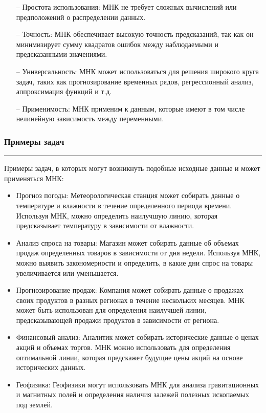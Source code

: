 \documentclass[a4paper, 14pt]{extarticle}
\begin{document}
\begin{itemize}
    \item[--] Простота использования: МНК не требует сложных вычислений или предположений о распределении данных. 
    \item[--] Точность: МНК обеспечивает высокую точность предсказаний, так как он минимизирует сумму квадратов ошибок между наблюдаемыми и предсказанными значениями.
    \item[--] Универсальность: МНК может использоваться для решения широкого круга задач, таких как прогнозирование временных рядов, регрессионный анализ, аппроксимация функций и т.д.
    \item[--] Применимость: МНК применим к данным, которые имеют в том числе нелинейную зависимость между переменными. 
\end{itemize}

\subsubsection*{{Примеры задач}}\vspace{-20pt}\rule{\linewidth}{0.1mm}

Примеры задач, в которых могут возникнуть подобные исходные данные и может применяться МНК: 

\begin{itemize}
    \item Прогноз погоды: Метеорологическая станция может собирать данные о температуре и влажности в течение определенного периода времени. Используя МНК, можно определить наилучшую линию, которая предсказывает температуру в зависимости от влажности.
    \item Анализ спроса на товары: Магазин может собирать данные об объемах продаж определенных товаров в зависимости от дня недели. Используя МНК, можно выявить закономерности и определить, в какие дни спрос на товары увеличивается или уменьшается.
    \item Прогнозирование продаж: Компания может собирать данные о продажах своих продуктов в разных регионах в течение нескольких месяцев. МНК может быть использован для определения наилучшей линии, предсказывающей продажи продуктов в зависимости от региона.
    \item Финансовый анализ: Аналитик может собирать исторические данные о ценах акций и объемах торгов. МНК можно использовать для определения оптимальной линии, которая предскажет будущие цены акций на основе исторических данных.
    \item Геофизика: Геофизики могут использовать МНК для анализа гравитационных и магнитных полей и определения наличия залежей полезных ископаемых под землей.
\end{itemize}
\end{document}
